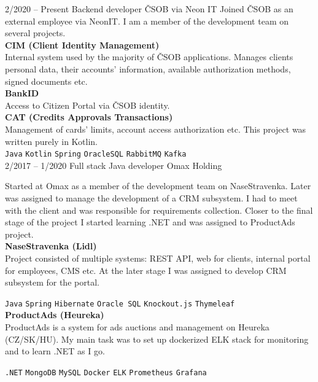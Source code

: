 \documentclass[9pt]{developercv} %
\begin{document}
\begin{entrylist}
    \entry
    {2/2020 -- Present}
    {Backend developer}
    {ČSOB via Neon IT}
    {
        Joined ČSOB as an external employee via NeonIT.
        I am a member of the development team on several projects.\\

        \textbf{CIM (Client Identity Management)}\\
        Internal system used by the majority of ČSOB applications.
        Manages clients personal data, their accounts' information, available authorization methods, signed documents etc.\\

        \textbf{BankID}\\
        Access to Citizen Portal via ČSOB identity.\\

        \textbf{CAT (Credits Approvals Transactions)}\\
        Management of cards' limits, account access authorization etc.
        This project was written purely in Kotlin.\\

        \texttt{Java}\slashsep
        \texttt{Kotlin}\slashsep
        \texttt{Spring}\slashsep
        \texttt{OracleSQL}\slashsep
        \texttt{RabbitMQ}\slashsep
        \texttt{Kafka}\\
    }
    \entry
    {2/2017 -- 1/2020}
    {Full stack Java developer}
    {Omax Holding}
    {
        Started at Omax as a member of the development team on NaseStravenka.
        Later was assigned to manage the development of a CRM subsystem.
        I had to meet with the client and was responsible for requirements collection.
        Closer to the final stage of the project I started learning .NET and was assigned to ProductAds project.\\

        \textbf{NaseStravenka (Lidl)}\\
        Project consisted of multiple systems: REST API, web for clients, internal portal for employees, CMS etc.
        At the later stage I was assigned to develop CRM subsystem for the portal.

        \texttt{Java}\slashsep
        \texttt{Spring}\slashsep
        \texttt{Hibernate}\slashsep
        \texttt{Oracle SQL}\slashsep
        \texttt{Knockout.js}\slashsep
        \texttt{Thymeleaf}\\

        \textbf{ProductAds (Heureka)}\\
        ProductAds is a system for ads auctions and management on Heureka (CZ/SK/HU).
        My main task was to set up dockerized ELK stack for monitoring and to learn .NET as I go.

        \texttt{.NET}\slashsep
        \texttt{MongoDB}\slashsep
        \texttt{MySQL}\slashsep
        \texttt{Docker}\slashsep
        \texttt{ELK}\slashsep
        \texttt{Prometheus}\slashsep
        \texttt{Grafana}\\
    }
\end{entrylist}
\end{document}
